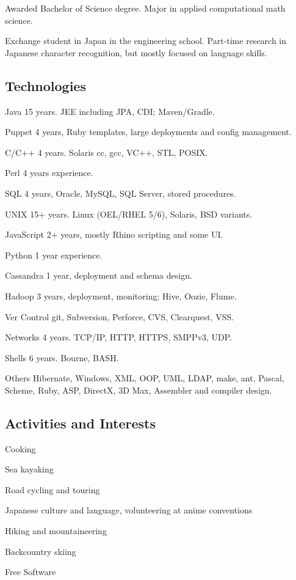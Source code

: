 \documentclass{article}
\begin{document}
Awarded Bachelor of Science degree.  Major in applied computational math science.

Exchange student in Japan in the engineering school. Part-time
research in Japanese character recognition, but mostly focused on
language skills.

\subsection*{Technologies}

\begin{multicols}{2}
\begin{items}
\end{items}
\item[Java] 15 years. JEE including JPA, CDI; Maven/Gradle. 
\item[Puppet] 4 years, Ruby templates, large deployments and config management.
\item[C/C++] 4 years. Solaris cc, gcc, VC++, STL, POSIX.
\item[Perl] 4 years experience.
\item[SQL] 4 years, Oracle, MySQL, SQL Server, stored procedures.
\item[UNIX] 15+ years. Linux (OEL/RHEL 5/6), Solaris, BSD variants.
\item[JavaScript] 2+ years, mostly Rhino scripting and some UI.
\item[Python] 1 year experience.
\item[Cassandra] 1 year, deployment and schema design.
\item[Hadoop] 3 years, deployment, monitoring; Hive, Oozie, Flume.
\item[Ver Control] git, Subversion, Perforce, CVS, Clearquest, VSS.
\item[Networks] 4 years. TCP/IP, HTTP, HTTPS, SMPPv3, UDP.
\item[Shells] 6 years. Bourne, BASH.
\item[Others] Hibernate, Windows, XML, OOP, UML, LDAP, make, ant, Pascal,
Scheme, Ruby, ASP, DirectX, 3D Max, Assembler and compiler design.
\end{multicols}

\subsection*{Activities and Interests}
\begin{items}
\item Cooking
\item Sea kayaking
\item Road cycling and touring
\item Japanese culture and language, volunteering at anime conventions
\item Hiking and mountaineering
\item Backcountry skiing
\item Free Software
\end{items}
\end{document}
